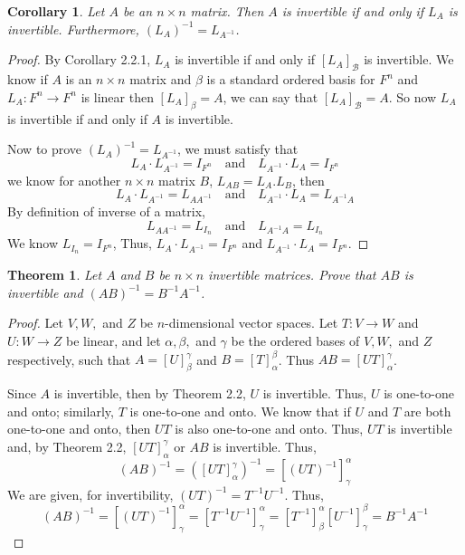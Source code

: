 \documentclass[12pt, a4paper]{article}
\newtheorem{theorem}{Theorem}[section]
\newtheorem{corollary}{Corollary}[theorem]
\theoremstyle{definition}
\theoremstyle{remark}
\begin{document}
\begin{corollary}
    Let $A$ be an $n \times n$ matrix. Then $A$ is invertible if and only if $L_A$ is invertible. Furthermore, $(L_A)^{-1} = L_{A^{-1}}$.
    
\end{corollary}

\begin{proof}
    By Corollary 2.2.1, $L_A$ is invertible if and only if $[L_A]_{\mathscr{B}}$ is invertible. We know if $A$ is an $n \times n$ matrix and $\beta$ is a standard ordered basis for $F^n$ and $L_A:F^n \to F^n$ is linear then $[L_A]_\beta = A$, we can say that $[L_A]_{\mathscr{B}} = A$. So now $L_A$ is invertible if and only if $A$ is invertible.

Now to prove $(L_A)^{-1} = L_{A^{-1}}$, we must satisfy that
$$L_A \cdot L_{A^{-1}} = I_{F^n} \quad \text{and} \quad L_{A^{-1}} \cdot L_A = I_{F^n}$$
we know for another $n \times n$ matrix $B$, $L_{AB} = L_A . L_B$, then
$$L_A \cdot L_{A^{-1}} = L_{AA^{-1}} \quad \text{and} \quad L_{A^{-1}} \cdot L_A = L_{A^{-1}A}$$
By definition of inverse of a matrix,
$$L_{AA^{-1}} = L_{I_n} \quad \text{and} \quad L_{A^{-1}A} = L_{I_n}$$
We know $L_{I_n} = I_{F^n}$,
Thus, $L_A \cdot L_{A^{-1}} = I_{F^n}$ and $L_{A^{-1}} \cdot L_A = I_{F^n}$.
\end{proof}

\begin{theorem}
    Let $A$ and $B$ be $n \times n$ invertible matrices. Prove that $AB$ is invertible and $(AB)^{-1} = B^{-1}A^{-1}$.
\end{theorem}

\begin{proof}
    Let $V, W,$ and $Z$ be $n$-dimensional vector spaces. Let $T: V \to W$ and $U: W \to Z$ be linear, and let $\alpha, \beta,$ and $\gamma$ be the ordered bases of $V, W,$ and $Z$ respectively, such that $A = [U]_\beta^\gamma$ and $B = [T]_\alpha^\beta$. Thus $AB = [UT]_\alpha^\gamma$.

Since $A$ is invertible, then by Theorem 2.2, $U$ is invertible. Thus, $U$ is one-to-one and onto; similarly, $T$ is one-to-one and onto. We know that if $U$ and $T$ are both one-to-one and onto, then $UT$ is also one-to-one and onto. Thus, $UT$ is invertible and, by Theorem 2.2, $[UT]_\alpha^\gamma$ or $AB$ is invertible. Thus,
\[ (AB)^{-1} = ([UT]_\alpha^\gamma)^{-1} = [(UT)^{-1}]_\gamma^\alpha \]
We are given, for invertibility, $(UT)^{-1} = T^{-1}U^{-1}$. Thus,
\[ (AB)^{-1} = [(UT)^{-1}]_\gamma^\alpha = [T^{-1}U^{-1}]_\gamma^\alpha = [T^{-1}]_\beta^\alpha [U^{-1}]_\gamma^\beta = B^{-1}A^{-1} \]
\end{proof}
\end{document}

